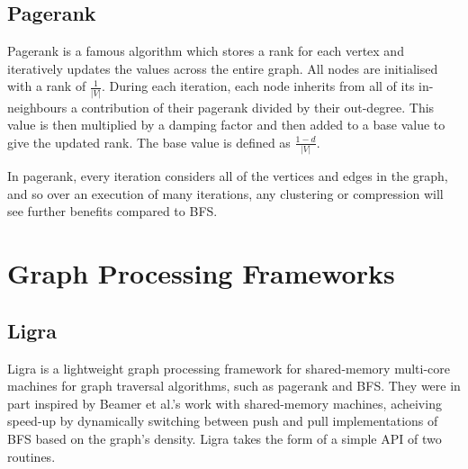 \subsection{Pagerank}

Pagerank is a famous algorithm which stores a rank for each vertex and iteratively updates the values
across the entire graph. All nodes are initialised with a rank of $\frac{1}{|V|}$. During each
iteration, each node inherits from all of its in-neighbours a contribution of their pagerank divided
by their out-degree. This value is then multiplied by a damping factor and then added to a base value
to give the updated rank. The base value is defined as $\frac{1 - d}{|V|}$.

In pagerank, every iteration considers all of the vertices and edges in the graph, and so over
an execution of many iterations, any clustering or compression will see further benefits compared to
BFS.

\section{Graph Processing Frameworks}

\subsection{Ligra}

Ligra is a lightweight graph processing framework for shared-memory multi-core machines for graph
traversal algorithms, such as pagerank and BFS. They were in part inspired by Beamer et al.'s work
with shared-memory machines, acheiving speed-up by dynamically switching between push and pull implementations of BFS based on the graph's density. Ligra takes the form of a simple API of two
routines.

